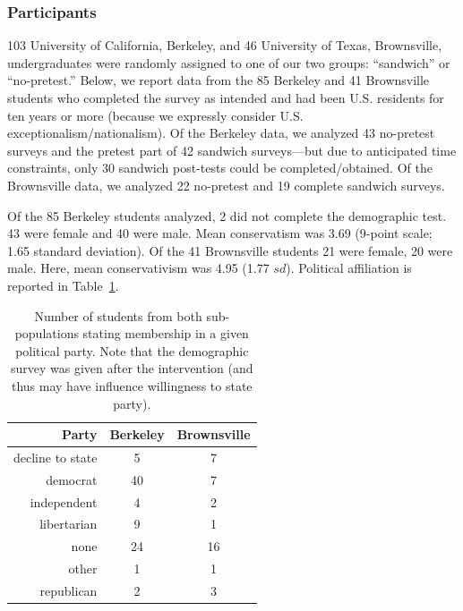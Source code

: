 \subsubsection{Participants}


103 University of California, Berkeley, and 46 University of Texas, Brownsville,
undergraduates were randomly assigned to one of our two groups: “sandwich” or
“no-pretest.” Below, we report data from the 85 Berkeley and 41 Brownsville
students who completed the survey as intended and had been U.S. residents for
ten years or more (because we expressly consider U.S.
exceptionalism/nationalism). Of the Berkeley data, we analyzed 43 no-pretest
surveys and the pretest part of 42 sandwich surveys---but due to
anticipated time constraints, only 30 sandwich post-tests could be
completed/obtained. Of the Brownsville data, we analyzed 22 no-pretest and 19
complete sandwich surveys.

Of the 85 Berkeley students analyzed, 2 did not complete the demographic test.
43 were female and 40 were male. Mean conservatism was 3.69 (9-point scale; 1.65
standard deviation). Of the 41 Brownsville students 21 were female, 20 were
male. Here, mean conservativism was 4.95 (1.77 $sd$). Political
affiliation is reported in Table~\ref{table:study1-affiliation}.

\begin{table}
    \centering
    \caption{Number of students from both sub-populations stating membership in
        a given political party. Note that the demographic survey was given
        after the intervention (and thus may have influence willingness to state
        party).}
    \label{table:study1-affiliation}
    \begin{tabular}{rcc}
        \toprule
        Party & Berkeley & Brownsville \\
        \midrule
          decline to state &   5  & 7 \\
          democrat &  40  & 7 \\
          independent &   4  & 2 \\
          libertarian &   9  & 1 \\
          none &  24   & 16 \\
          other &   1  & 1 \\
          republican &   2  & 3 \\
        \bottomrule
    \end{tabular}
\end{table}


